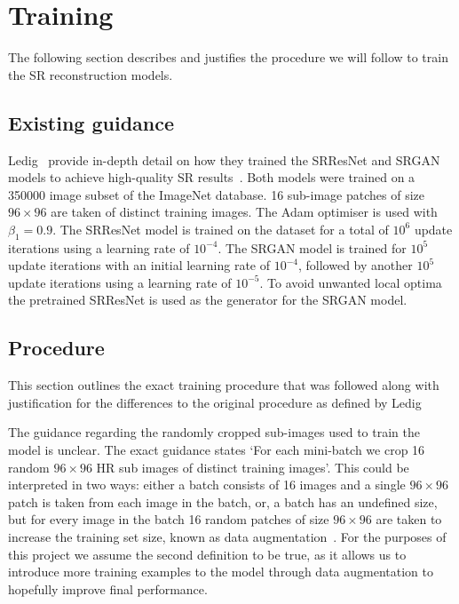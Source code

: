 \section{Training}
The following section describes and justifies the procedure we will follow to train the SR reconstruction models.

\subsection{Existing guidance}
Ledig \etal\ provide in-depth detail on how they trained the SRResNet and SRGAN models to achieve high-quality SR results~\cite{srgan}. Both models were trained on a 350000 image subset of the ImageNet database. 16 sub-image patches of size $96 \times 96$ are taken of distinct training images. The Adam optimiser is used with $\beta_1 = 0.9$. The SRResNet model is trained on the dataset for a total of $10^6$ update iterations using a learning rate of $10^{-4}$. The SRGAN model is trained for $10^5$ update iterations with an initial learning rate of $10^{-4}$, followed by another $10^5$ update iterations using a learning rate of $10^{-5}$. To avoid unwanted local optima the pretrained SRResNet is used as the generator for the SRGAN model.

\subsection{Procedure}\label{subsec:procedure}
This section outlines the exact training procedure that was followed along with justification for the differences to the original procedure as defined by Ledig \etal

The guidance regarding the randomly cropped sub-images used to train the model is unclear. The exact guidance states `For each mini-batch we crop 16 random $96 \times 96$ HR sub images of distinct training images'. This could be interpreted in two ways: either a batch consists of 16 images and a single $96 \times 96$ patch is taken from each image in the batch, or, a batch has an undefined size, but for every image in the batch 16 random patches of size $96 \times 96$ are taken to increase the training set size, known as data augmentation~\cite{dataAugmentation}. For the purposes of this project we assume the second definition to be true, as it allows us to introduce more training examples to the model through data augmentation to hopefully improve final performance.

